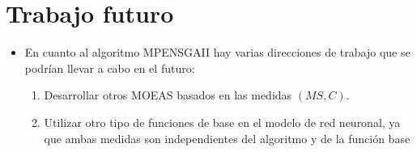 \section{Trabajo futuro}
\begin{itemize}
	\item En cuanto al algoritmo MPENSGAII hay varias direcciones de trabajo que se podrían llevar a
			cabo en el futuro:
			\begin{enumerate}
					\item Desarrollar otros MOEAS basados en las medidas $(MS,C)$.
					\item Utilizar otro tipo de funciones de base en el modelo de red neuronal, ya que
					ambas medidas son	independientes del algoritmo y de la función base

\end{enumerate}
\end{itemize}
